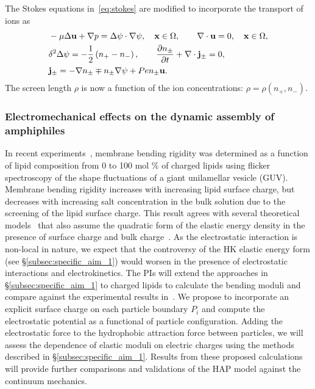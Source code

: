 The Stokes equations in~\eqref{eq:stokes} are modified to incorporate the transport of ions as
\begin{equation}
\label{eq:stokes}
\begin{aligned}
  &-\mu \Delta \mathbf{u} + \nabla p = \Delta\psi\cdot\nabla\psi, \quad \mathbf{x} \in \Omega, \qquad
  \nabla \cdot \mathbf{u} = 0,  \quad \mathbf{x} \in \Omega,\\
  &\delta^2\Delta\psi = -\frac{1}{2}\left(n_+-n_-\right),\qquad
  \frac{\partial n_{\pm}}{\partial t} + \nabla\cdot{\bf j}_{\pm} = 0,\\
  &{\bf j}_{\pm} = -\nabla n_{\pm} \mp n_{\pm} \nabla\psi + Pe n_{\pm}\mathbf{u}.
\end{aligned}
\end{equation}
The screen length $\rho$ is now a function of the ion concentrations: $\rho = \rho(n_+,n_-)$. 






\subsubsection{Electromechanical effects on the dynamic assembly of amphiphiles \label{subsubsec:em_effects}}
In recent experiments~\cite{FaizEtAl2019_SoftMatt}, membrane bending
rigidity was determined as a function of lipid composition from 0 to 100
mol $\%$ of charged lipids using flicker spectroscopy of the shape
fluctuations of a giant unilamellar vesicle (GUV).
Membrane bending rigidity increases with increasing lipid surface
charge, but decreases with increasing salt concentration in the bulk
solution due to the screening of the lipid surface charge. This
result agrees
with several theoretical models~\cite{Kralchevsky1996_JCIS,
May1996_JChemPhys, LoubetEtAl2013_PRE} that also assume the quadratic
form of the elastic energy density in the presence of surface charge and
bulk charge~\cite{DuplantierGoldstein1990_PRL, Winterhalter1992_JPC}. As
the electrostatic interaction is non-local in nature, we expect that the
controversy of the HK elastic energy form (see
\S\ref{subsec:specific_aim_1}) would worsen in the presence of
electrostatic interactions and electrokinetics. The PIs will extend the
approaches in \S\ref{subsec:specific_aim_1} to charged lipids to
calculate the bending moduli and compare against the experimental
results in~\cite{FaizEtAl2019_SoftMatt}. We propose to incorporate an
explicit surface charge on each particle boundary $P_i$ and compute the
electrostatic potential as a functional of particle configuration.
Adding the electrostatic force to the hydrophobic attraction force
between particles, we will assess the dependence of elastic moduli on
electric charges using the methods described in
\S\ref{subsec:specific_aim_1}. Results from these proposed calculations
will provide further comparisons and validations of the HAP model
against the continuum mechanics.

